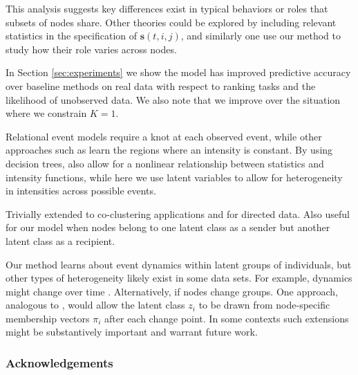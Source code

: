 \documentclass{article}
\begin{document}
This analysis suggests key differences exist in typical behaviors or roles that subsets of nodes share.  Other theories could be explored by including relevant statistics in the specification of $\mathbf{s}(t,i,j)$, and similarly one use our method to study how their role varies across nodes.

In Section \ref{sec:experiments} we show the model has improved predictive accuracy over baseline methods on real data with respect to ranking tasks and the likelihood of unobserved data.  We also note that we improve over the situation where we constrain $K=1$.

Relational event models \cite{Butts2008} require a knot at each observed event, while other approaches such as \cite{Gunawardana2011} learn the regions where an intensity is constant.  By using decision trees,  \cite{Gunawardana2011} also allow for a nonlinear relationship between statistics and intensity functions, while here we use latent variables to allow for heterogeneity in intensities across possible events.

Trivially extended to co-clustering applications and for directed data.  Also useful for our model when nodes belong to one latent class as a sender but another latent class as a recipient.

Our method learns about event dynamics within latent groups of individuals, but other types of heterogeneity likely exist in some data sets.  For example, dynamics might change over time \cite{Vu2011}.  Alternatively, if nodes change groups.  One approach, analogous to \cite{Airoldi2008}, would allow the latent class $z_i$ to be drawn from node-specific membership vectors $\pi_i$  after each change point.  In some contexts such extensions might be substantively important and warrant future work.

\subsubsection*{Acknowledgements}




\end{document}
